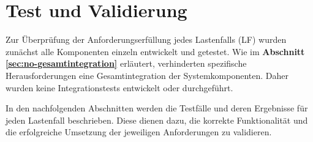 \newpage
\section{Test und Validierung}
\label{sec:test-validation}
Zur Überprüfung der Anforderungserfüllung jedes Lastenfalls (LF) wurden zunächst alle Komponenten einzeln entwickelt und getestet. Wie im \textbf{Abschnitt \ref{sec:no-gesamtintegration}} erläutert, verhinderten spezifische Herausforderungen eine Gesamtintegration der Systemkomponenten. Daher wurden keine Integrationstests entwickelt oder durchgeführt.

In den nachfolgenden Abschnitten werden die Testfälle und deren Ergebnisse für jeden Lastenfall beschrieben. Diese dienen dazu, die korrekte Funktionalität und die erfolgreiche Umsetzung der jeweiligen Anforderungen zu validieren.












